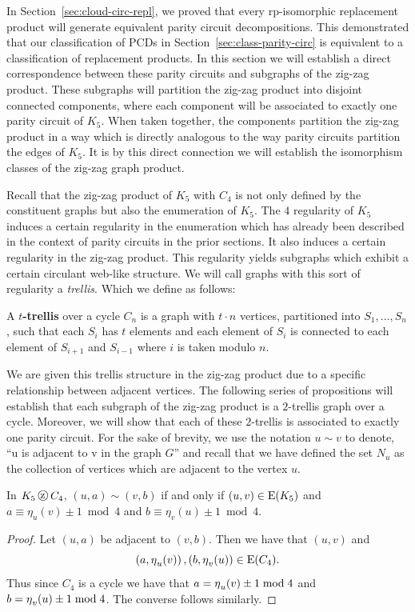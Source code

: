 In Section~\ref{sec:cloud-circ-repl}, we proved that every rp-isomorphic replacement product will generate equivalent parity circuit decompositions. This demonstrated that our classification of PCDs in Section~\ref{sec:class-parity-circ} is equivalent to a classification of replacement products. In this section we will establish a direct correspondence between these parity circuits and subgraphs of the zig-zag product. These subgraphs will partition the zig-zag product into disjoint connected components, where each component will be associated to exactly one parity circuit of $K_5$. When taken together, the components partition the zig-zag product in a way which is directly analogous to the way parity circuits partition the edges of $K_5$. It is by this direct connection we will establish the isomorphism classes of the zig-zag graph product.

Recall that the zig-zag product of $K_5$ with $C_4$ is not only defined by the constituent graphs but also the enumeration of $K_5$. The $4$ regularity of $K_5$ induces a certain regularity in the enumeration which has already been described in the context of parity circuits in the prior sections. It also induces a certain regularity in the zig-zag product. This regularity yields subgraphs which exhibit a certain circulant web-like structure. We will call graphs with this sort of regularity a {\em trellis}. Which we define as follows: 

\begin{definition}
  \label{def:trellis}
A {\bf $t$-trellis} over a cycle $C_n$ is a graph with $t \cdot n$ vertices, partitioned into $S_1,\ldots, S_n$, such that each $S_i$ has $t$ elements and each element of $S_i$ is connected to each element of $S_{i+1}$ and $S_{i-1}$ where $i$ is taken modulo $n$. 
\end{definition}
 
We are given this trellis structure in the zig-zag product due to a specific relationship between adjacent vertices. The following series of propositions will establish that each subgraph of the zig-zag product is a $2$-trellis graph over a cycle. Moreover, we will show that each of these $2$-trellis is associated to exactly one parity circuit.  For the sake of brevity, we use the notation  $u \sim v$ to denote, ``u is adjacent to v in the graph $G$'' and recall that we have defined the set $N_{u}$ as the collection of vertices which are adjacent to the vertex $u$.  

\begin{proposition}
\label{prop:everything}
In $K_5 \zigzag C_4$, $(u,a) \sim (v,b)$ if and only if $\left(u,v\right) \in \mathrm{E}(K_5) $ and $a \equiv \eta_u(v) \pm 1 \bmod{4}$ and $b \equiv \eta_v(u) \pm 1 \bmod{4}.$
\end{proposition}
\begin{proof}

Let $(u,a)$ be adjacent to $(v,b)$. Then we have that $(u,v)$ and \[ \left(a,\operatorname{\eta}_{u}(v)  \right), \left(b, \operatorname{\eta}_{v}(u) \right) \in \mathrm{E}(C_4) .\] Thus since $C_4$ is a cycle we have that $a = \operatorname{\eta}_{u}(v) \pm 1 \bmod{4}$ and $b = \operatorname{\eta}_{v}(u) \pm 1 \bmod{4}$. The converse follows similarly. 
\end{proof}

